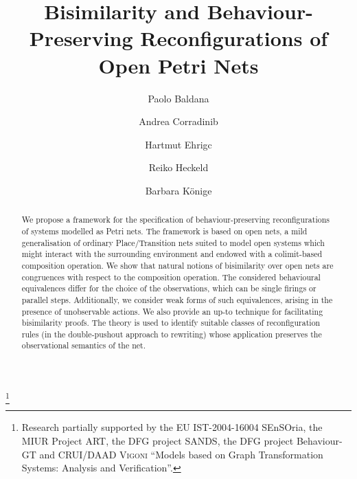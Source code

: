 \documentclass{LMCS}
\begin{document}
\title[Bisimilarity and Behaviour-Preserving Reconfigurations of
  Petri Nets]{Bisimilarity and Behaviour-Preserving Reconfigurations of Open
  Petri Nets}

\author[P. Baldan]{Paolo Baldan\rsuper a} 
\address{{\lsuper a}Dipartimento di Matematica Pura e Applicata, 
  Universit\`{a} di Padova, Italy}

\author[A. Corradini]{Andrea Corradini\rsuper b}
\address{{\lsuper b}Dipartimento di Informatica, Universit\`{a} di Pisa, Italy}

\author[H. Ehrig]{Hartmut Ehrig\rsuper c}
\address{{\lsuper c}Institut f\"ur Softwaretechnik und Theoretische Informatik,
  Technische~Universit\"at Berlin, Germany}

\author[R. Heckel]{Reiko Heckel\rsuper d}
\address{{\lsuper d}Department of Computer Science, University of Leicester, UK}

\author[B. K\"onig]{Barbara K\"onig\rsuper e}
\address{{\lsuper e}Abteilung f\"ur Informatik und Angewandte 
  Kognitionswissenschaft,
  Universit{\"{a}t} Duisburg-Essen, Germany}


\thanks{Research partially supported by the EU
    IST-2004-16004 {\sc SEnSOria}, the MIUR Project ART, the DFG
    project SANDS, the DFG project Behaviour-GT and CRUI/DAAD
    \textsc{Vigoni} ``Models based on Graph Transformation Systems:
    Analysis and Verification''.}





\begin{abstract}
  We propose a framework for the specification of behaviour-preserving
  reconfigurations of systems modelled as Petri nets. The framework is
  based on open nets, a mild generalisation of ordinary
  Place/Transition nets suited to model open systems which might
  interact with the surrounding environment and endowed with a
  colimit-based composition operation. We show that natural notions of
  bisimilarity over open nets are congruences with respect to the
  composition operation.  
The considered behavioural equivalences differ for the choice
  of the observations, which can be single firings or parallel
  steps. Additionally, we consider weak forms of such
  equivalences, arising in the presence of unobservable actions.
We also provide an up-to technique for facilitating bisimilarity
  proofs. The theory is used to identify suitable classes of
  reconfiguration rules (in the double-pushout approach to rewriting)
  whose application preserves the observational semantics of the net.
\end{abstract}
\end{document}
